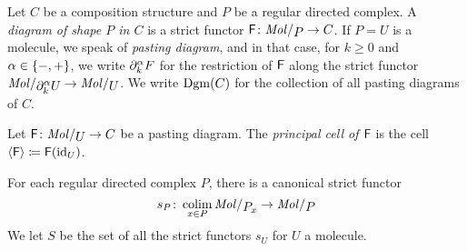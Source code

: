 \begin{dfn} 
    Let \( C \) be a composition structure and \( P \) be a regular directed complex.
    A \emph{diagram of shape \( P \) in \( C \)} is a strict functor \( \F \colon \molecin{P} \to C \).
    If \( P = U \) is a molecule, we speak of \emph{pasting diagram}, and in that case, for \( k \geq 0 \) and \( \alpha \in \left\{ {-, +} \right\} \), we write \( \partial_{k}^{\alpha} F \) for the restriction of \( \mathsf{F} \) along the strict functor \( \molecin{\bd{k}{\a} U} \to \molecin{U} \).
    We write \( \operatorname{Dgm}(C) \) for the collection of all pasting diagrams of \( C \).
\end{dfn}

\begin{dfn} 
    Let \( \F \colon \molecin{U} \to C \) be a pasting diagram.
    The \emph{principal cell of \( \mathsf{F} \)} is the cell \( \langle\mathsf{F}\rangle \coloneqq \mathsf{F}(\mathrm{id}_{U}) \).
\end{dfn}

\noindent For each regular directed complex \( P \), there is a canonical strict functor
\begin{equation*}
    s_P \colon \colim_{x \in P} \molecin{\imel{P}{x}} \to \molecin{P}
\end{equation*}
We let \( S \) be the set of all the strict functors \( s_U \) for \( U \) a molecule.

